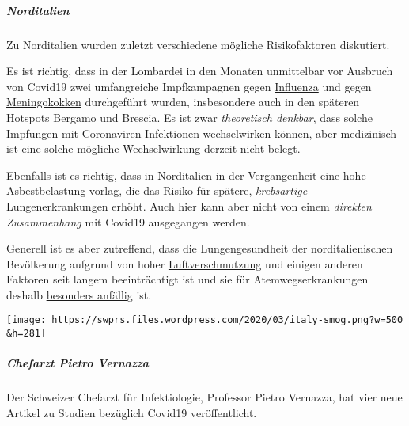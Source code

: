 \hypertarget{norditalien}{%
\subparagraph{\texorpdfstring{\textbf{Norditalien}}{Norditalien}}\label{norditalien}}

Zu Norditalien wurden zuletzt verschiedene mögliche Risikofaktoren
diskutiert.

Es ist richtig, dass in der Lombardei in den Monaten unmittelbar vor
Ausbruch von Covid19 zwei umfangreiche Impfkampagnen gegen
\href{https://www.bergamonews.it/2019/10/21/vaccinazione-antinfluenzale-a-bergamo-ordinate-185-000-dosi-di-vaccino/332164/}{Influenza}
und gegen
\href{https://www.bsnews.it/2020/01/18/meningite-vaccinate-34mila-persone-tra-brescia-e-bergamo/}{Meningokokken}
durchgeführt wurden, insbesondere auch in den späteren Hotspots Bergamo
und Brescia. Es ist zwar \emph{theoretisch denkbar}, dass solche
Impfungen mit Coronaviren-Infektionen wechselwirken können, aber
medizinisch ist eine solche mögliche Wechselwirkung derzeit nicht
belegt.

Ebenfalls ist es richtig, dass in Norditalien in der Vergangenheit eine
hohe
\href{https://www.spiegel.de/panorama/justiz/asbest-prozess-in-italien-nun-sind-alle-krank-a-666421.html}{Asbestbelastung}
vorlag, die das Risiko für spätere, \emph{krebsartige}
Lungenerkrankungen erhöht. Auch hier kann aber nicht von einem
\emph{direkten Zusammenhang} mit Covid19 ausgegangen werden.

Generell ist es aber zutreffend, dass die Lungengesundheit der
norditalienischen Bevölkerung aufgrund von hoher
\href{https://www.heise.de/tp/features/Feinstaubpartikel-als-Viren-Vehikel-4687454.html}{Luftverschmutzung}
und einigen anderen Faktoren seit langem beeinträchtigt ist und sie für
Atemwegserkrankungen deshalb
\href{https://www.srf.ch/news/international/massive-schadstoffbelastung-nirgendwo-erkranken-so-viele-wegen-smog-wie-in-norditalien}{besonders
anfällig} ist.

\texttt{[image: https://swprs.files.wordpress.com/2020/03/italy-smog.png?w=500\\\&h=281]}

\hypertarget{chefarzt-pietro-vernazza}{%
\subparagraph{\texorpdfstring{\textbf{Chefarzt Pietro
Vernazza}}{Chefarzt Pietro Vernazza}}\label{chefarzt-pietro-vernazza}}

Der Schweizer Chefarzt für Infektiologie, Professor Pietro Vernazza, hat
vier neue Artikel zu Studien bezüglich Covid19 veröffentlicht.

